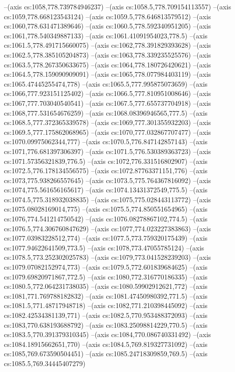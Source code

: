 --(axis cs:1058,778.739784946237)
--(axis cs:1058.5,778.709154113557)
--(axis cs:1059,778.668123543124)
--(axis cs:1059.5,778.646813579512)
--(axis cs:1060,778.631471389646)
--(axis cs:1060.5,778.592340951205)
--(axis cs:1061,778.540349887133)
--(axis cs:1061.41091954023,778.5)
--(axis cs:1061.5,778.491715660075)
--(axis cs:1062,778.391829393628)
--(axis cs:1062.5,778.385105204873)
--(axis cs:1063,778.339235525576)
--(axis cs:1063.5,778.267350633675)
--(axis cs:1064,778.180726420621)
--(axis cs:1064.5,778.159090909091)
--(axis cs:1065,778.077984403119)
--(axis cs:1065.47445255474,778)
--(axis cs:1065.5,777.995875073659)
--(axis cs:1066,777.923151125402)
--(axis cs:1066.5,777.810951008646)
--(axis cs:1067,777.703040540541)
--(axis cs:1067.5,777.655737704918)
--(axis cs:1068,777.531654676259)
--(axis cs:1068.08396946565,777.5)
--(axis cs:1068.5,777.372365339578)
--(axis cs:1069,777.301355932203)
--(axis cs:1069.5,777.175862068965)
--(axis cs:1070,777.032867707477)
--(axis cs:1070.09975062344,777)
--(axis cs:1070.5,776.847142857143)
--(axis cs:1071,776.681397306397)
--(axis cs:1071.5,776.530389363723)
--(axis cs:1071.57356321839,776.5)
--(axis cs:1072,776.331516802907)
--(axis cs:1072.5,776.178134556575)
--(axis cs:1072.87763371151,776)
--(axis cs:1073,775.938266557645)
--(axis cs:1073.5,775.764367816092)
--(axis cs:1074,775.561656165617)
--(axis cs:1074.13431372549,775.5)
--(axis cs:1074.5,775.318932038835)
--(axis cs:1075,775.028443113772)
--(axis cs:1075.08028169014,775)
--(axis cs:1075.5,774.850551654965)
--(axis cs:1076,774.541214750542)
--(axis cs:1076.08278867102,774.5)
--(axis cs:1076.5,774.306760847629)
--(axis cs:1077,774.023227383863)
--(axis cs:1077.03983228512,774)
--(axis cs:1077.5,773.759320175439)
--(axis cs:1077.94622641509,773.5)
--(axis cs:1078,773.47055785124)
--(axis cs:1078.5,773.252302025783)
--(axis cs:1079,773.041528239203)
--(axis cs:1079.07082152974,773)
--(axis cs:1079.5,772.601839684625)
--(axis cs:1079.69820971867,772.5)
--(axis cs:1080,772.316770186335)
--(axis cs:1080.5,772.064231738035)
--(axis cs:1080.59902912621,772)
--(axis cs:1081,771.769788182832)
--(axis cs:1081.47450980392,771.5)
--(axis cs:1081.5,771.48717948718)
--(axis cs:1082,771.210398445092)
--(axis cs:1082.42534381139,771)
--(axis cs:1082.5,770.953488372093)
--(axis cs:1083,770.638193688792)
--(axis cs:1083.25098814229,770.5)
--(axis cs:1083.5,770.391379310345)
--(axis cs:1084,770.086740331492)
--(axis cs:1084.18915662651,770)
--(axis cs:1084.5,769.819327731092)
--(axis cs:1085,769.673590504451)
--(axis cs:1085.24718309859,769.5)
--(axis cs:1085.5,769.34445407279)
